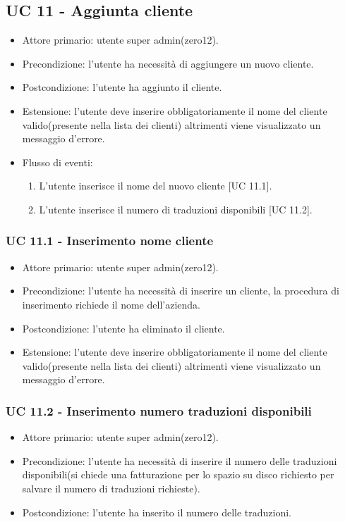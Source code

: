 \subsection{UC 11 - Aggiunta cliente}
    \begin{itemize}
        \item Attore primario: utente super admin(zero12).
        \item Precondizione: l'utente ha necessità di aggiungere un nuovo cliente.
        \item Postcondizione: l'utente ha aggiunto il cliente.
        \item Estensione: l'utente deve inserire obbligatoriamente il nome del cliente valido(presente nella lista dei clienti) altrimenti viene visualizzato un messaggio d'errore.
        \item Flusso di eventi:
        \begin{enumerate}
            \item L'utente inserisce il nome del nuovo cliente [UC 11.1].
            \item L'utente inserisce il numero di traduzioni disponibili [UC 11.2].
        \end{enumerate}
    \end{itemize}
    \subsubsection{UC 11.1 - Inserimento nome cliente}
        \begin{itemize}
            \item Attore primario: utente super admin(zero12).
            \item Precondizione: l'utente ha necessità di inserire un cliente, la procedura di inserimento richiede il nome dell'azienda.
            \item Postcondizione: l'utente ha eliminato il cliente.
            \item Estensione: l'utente deve inserire obbligatoriamente il nome del cliente valido(presente nella lista dei clienti) altrimenti viene visualizzato un messaggio d'errore.
        \end{itemize}
    \subsubsection{UC 11.2 - Inserimento numero traduzioni disponibili}
        \begin{itemize}
            \item Attore primario: utente super admin(zero12).
            \item Precondizione: l'utente ha necessità di inserire il numero delle traduzioni disponibili(si chiede una fatturazione per lo spazio su disco richiesto per salvare il numero di traduzioni richieste).
            \item Postcondizione: l'utente ha inserito il numero delle traduzioni.
        \end{itemize}
